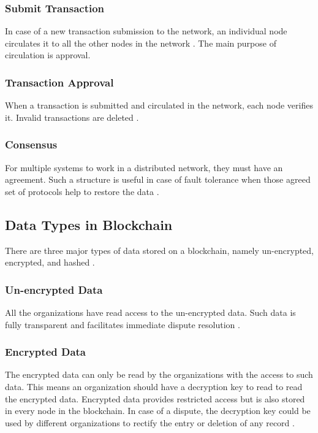 \documentclass[sigconf]{acmart}
\begin{document}
\subsubsection{Submit Transaction} In case of a new transaction submission to the network, an individual node circulates it to all the other nodes in the network \cite{pabc1}. The main purpose of circulation is approval. 

\subsubsection{Transaction Approval} When a transaction is submitted and circulated in the network, each node verifies it. Invalid transactions are deleted \cite{pabc1}.

\subsubsection{Consensus} For multiple systems to work in a distributed network, they must have an agreement. Such a structure is useful in case of fault tolerance when those agreed set of protocols help to restore the data \cite{pabc1}.

\subsection{Data Types in Blockchain}
There are three major types of data stored on a blockchain, namely un-encrypted, encrypted, and hashed \cite{arbc1}. 

\subsubsection{Un-encrypted Data} All the organizations have read access to the un-encrypted data. Such data is fully transparent and facilitates immediate dispute resolution \cite{arbc1}.

\subsubsection{Encrypted Data} The encrypted data can only be read by the organizations with the access to such data. This means an organization should have a decryption key to read to read the encrypted data. Encrypted data provides restricted access but is also stored in every node in the blockchain. In case of a dispute, the decryption key could be used by different organizations to rectify the entry or deletion of any record \cite{arbc1}.
\end{document}
